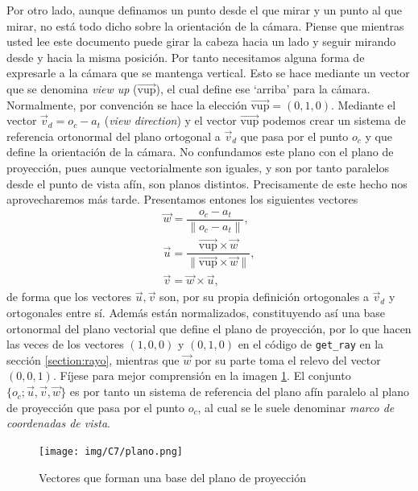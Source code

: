 Por otro lado, aunque definamos un punto desde el que mirar y un punto al que mirar, no está todo dicho sobre la orientación de la cámara. Piense que mientras usted lee este documento puede girar la cabeza hacia un lado y seguir mirando desde y hacia la misma posición. Por tanto necesitamos alguna forma de expresarle a la cámara que se mantenga vertical. Esto se hace mediante un vector que se denomina \textit{view up} ($\overrightarrow{\mathrm{vup}}$), el cual define ese `arriba' para la cámara. Normalmente, por convención se hace la elección $\overrightarrow{\mathrm{vup}}=(0,1,0)$. Mediante el vector $\vec{v}_d=o_c-a_t$ (\textit{view direction}) y el vector $\overrightarrow{\mathrm{vup}}$ podemos crear un sistema de referencia ortonormal del plano ortogonal a $\vec{v}_d$ que pasa por el punto $o_c$ y que define la orientación de la cámara. No confundamos este plano con el plano de proyección, pues aunque vectorialmente son iguales, y son por tanto paralelos desde el punto de vista afín, son planos distintos. Precisamente de este hecho nos aprovecharemos más tarde. Presentamos entones los siguientes vectores
\begin{eqnarray*}
    \vec w = \dfrac{o_c-a_t}{\|o_c-a_t\|}, \\
    \vec u = \dfrac{\overrightarrow{\mathrm{vup}}\times \vec w}{\|\overrightarrow{\mathrm{vup}} \times \vec w\|}, \\
    \vec v = \vec w\times \vec u,
\end{eqnarray*}
de forma que los vectores $\vec u,\vec v$ son, por su propia definición ortogonales a $\vec{v}_d$ y ortogonales entre sí. Además están normalizados, constituyendo así una base ortonormal del plano vectorial que define el plano de proyección, por lo que hacen las veces de los vectores $(1,0,0)$ y $(0,1,0)$ en el código de \verb|get_ray| en la sección \ref{section:rayo}, mientras que $\vec w$ por su parte toma el relevo del vector $(0,0,1)$. Fíjese para mejor comprensión en la imagen \ref{fig:vectores}. El conjunto $\{o_c; \vec u, \vec v,\vec w\}$ es por tanto un sistema de referencia del plano afín paralelo al plano de proyección que pasa por el punto $o_c$, al cual se le suele denominar \textit{marco de coordenadas de vista}.

\begin{figure} [ht]
    \centering
    \texttt{[image: img/C7/plano.png]}
    \caption{Vectores que forman una base del plano de proyección}
    \label{fig:vectores}
\end{figure}

